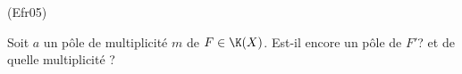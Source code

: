 \begin{tiny}(Efr05)\end{tiny} Soit $a$ un pôle de multiplicité $m$ de $F\in \K(X)$. Est-il encore un pôle de $F'$? et de quelle multiplicité ?  
